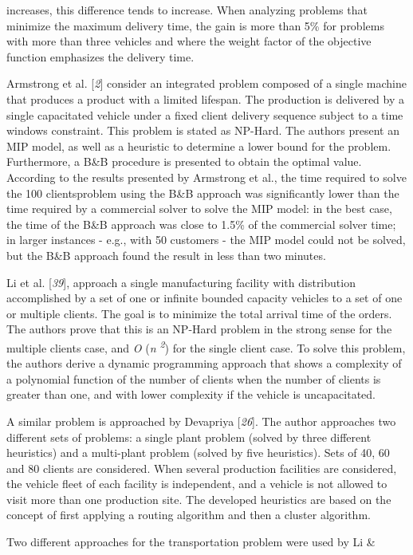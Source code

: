  increases, this difference tends to increase. When analyzing problems that minimize
 the maximum delivery time, the gain is more than 5\% for problems with more than three
 vehicles and where the weight factor of the objective function emphasizes the
 delivery time.\par Armstrong et al. [\textit{2}] consider an integrated
 problem composed of a single machine that produces a product with a limited lifespan.
 The production is delivered by a single capacitated vehicle under a fixed client
 delivery sequence subject to a time windows constraint. This problem is stated as
 NP-Hard. The authors present an MIP model, as well as a heuristic to determine a
 lower bound for the problem. Furthermore, a B\&B procedure is presented to obtain
 the optimal value. According to the results presented by Armstrong et al., the time
 required to solve the 100 clientsproblem using the B\&B approach was significantly
 lower than the time required by a commercial solver to solve the MIP model: in the
 best case, the time of the B\&B approach was close to 1.5\% of the commercial
 solver time; in larger instances - e.g., with 50 customers - the MIP model could not
 be solved, but the B\&B approach found the result in less than two minutes.\par Li et al. [\textit{39}], approach a single
 manufacturing facility with distribution accomplished by a set of one or infinite
 bounded capacity vehicles to a set of one or multiple clients. The goal is to
 minimize the total arrival time of the orders. The authors prove that this is an
 NP-Hard problem in the strong sense for the multiple clients case, and
 \textit{O} (\textit{n \textsuperscript{2}}) for the single client case. To
 solve this problem, the authors derive a dynamic programming approach that shows a
 complexity of a polynomial function of the number of clients when the number of
 clients is greater than one, and with lower complexity if the vehicle is
 uncapacitated.\par A similar problem is approached by Devapriya [\textit{26}]. The author approaches two different sets of problems: a single plant
 problem (solved by three different heuristics) and a multi-plant problem (solved by
 five heuristics). Sets of 40, 60 and 80 clients are considered. When several
 production facilities are considered, the vehicle fleet of each facility is
 independent, and a vehicle is not allowed to visit more than one production site. The
 developed heuristics are based on the concept of first applying a routing algorithm
 and then a cluster algorithm.\par Two different approaches for the transportation problem were used by Li \&
